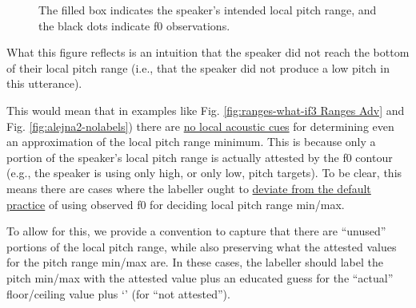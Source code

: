 \documentclass[11pt, twoside]{memoir}
\def\polar#1{{\relsize{-.5}\fontspec[Mapping=tex-text]{Roboto Mono}{#1}}}
\def\polarquot#1{‘\polar{#1}’}
\begin{document}
\begin{figure}[H]
\centering
{}
\caption{The filled box indicates the speaker’s intended local pitch range, and the black dots indicate f0 observations.%
\label{fig:ranges intuition alejna2}%
}
\end{figure}

What this figure reflects is an intuition that the speaker did not reach the bottom of their local pitch range (i.e., that the speaker did not produce a low pitch in this utterance).

This would mean that in examples like Fig. \ref{fig:ranges-what-if3 Ranges Adv} and Fig. \ref{fig:alejna2-nolabels}) there are \uline{no local acoustic cues} for determining even an approximation of the local pitch range minimum. This is because only a portion of the speaker’s local pitch range is actually attested by the f0 contour (e.g., the speaker is using only high, or only low, pitch targets). To be clear, this means there are cases where the labeller ought to \uline{deviate from the default practice} of using observed f0 for deciding local pitch range min\slash max.

To allow for this, we provide a convention to capture that there are “unused” portions of the local pitch range, while also preserving what the attested values for the pitch range min\slash max are. In these cases, the labeller should label the pitch min\slash max with the attested value plus an educated guess for the “actual” floor\slash ceiling value plus \polarquot{:na} (for “not attested”).
\end{document}
